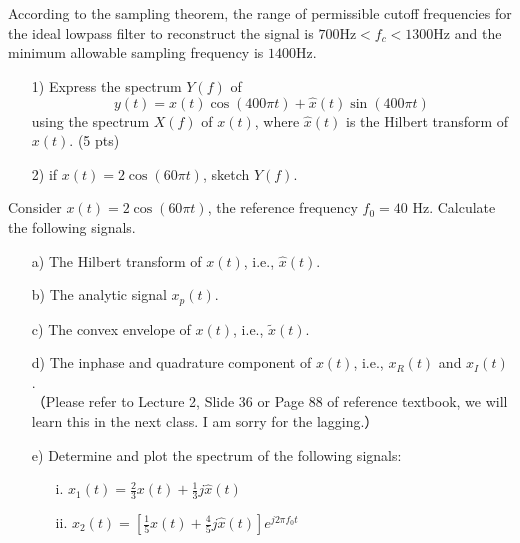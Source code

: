 \documentclass{assignment}
\begin{document}
\begin{sol}
\begin{figure}[h]
        \caption{}
        \label{5}
    \end{figure}
    According to the sampling theorem, the range of permissible cutoff frequencies for the ideal lowpass filter to reconstruct the signal is $700\text{Hz}<f_c<1300$Hz and the minimum allowable sampling frequency is $1400$Hz.
\end{sol}

\begin{prob}
    \begin{itemize}
        \item[1)] Express the spectrum $Y(f)$ of
        \[
            y(t)=x(t)\cos(400\pi t)+\hat{x}(t)\sin(400\pi t)
        \]
        using the spectrum $X(f)$ of $x(t)$, where $\hat{x}(t)$ is the Hilbert transform of $x(t)$. (5 pts)
        \item[2)] if $x(t)=2\cos(60\pi t)$, sketch $Y(f).$
    \end{itemize}
\end{prob}
\begin{sol}

\end{sol}

\begin{prob}
    Consider $x(t)=2\cos(60\pi t)$, the reference frequency $f_0=40$ Hz. Calculate the following signals.
    \begin{itemize}
        \item[a)] The Hilbert transform of $x(t)$, i.e., $\hat{x}(t)$.
        \item[b)] The analytic signal $x_p(t)$.
        \item[c)] The convex envelope of $x(t)$, i.e., $\tilde{x}(t)$.
        \item[d)] The inphase and quadrature component of $x(t)$, i.e., $x_R(t)$ and $x_I(t)$.\\
        （Please refer to Lecture 2, Slide 36 or Page 88 of reference textbook, we will learn this in the next class. I am sorry for the lagging.）
        \item[e)] Determine and plot the spectrum of the following signals:
        \begin{itemize}
            \item[i.] $x_1(t)=\frac{2}{3}x(t)+\frac{1}{3}j\hat{x}(t)$
            \item[ii.] $x_2(t)=\left[\frac{1}{5}x(t)+\frac{4}{5}j\hat{x}(t)\right]e^{j2\pi f_0t}$
        \end{itemize}
    \end{itemize}
\end{prob}
\begin{sol}

\end{sol}
\end{document}
